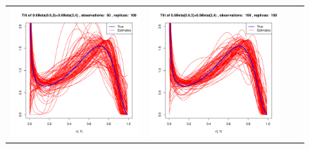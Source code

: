 \documentclass[10pt]{report}
\begin{document}
\begin{figure}[h]
\begin{tabular}{cccc}
	
	\includegraphics[width=\textwidth/4]{../img/p05_a05_b3_p05_a2_b4/tilted/K2/densities/n50_R100.pdf}
	&
	\includegraphics[width=\textwidth/4]{../img/p05_a05_b3_p05_a2_b4/tilted/K2/densities/n100_R100.pdf}

\end{tabular}
\end{figure}
\end{document}
